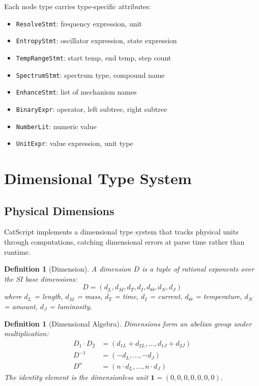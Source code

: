 \documentclass[twocolumn,10pt]{article}
\newtheorem{definition}[theorem]{Definition}
\begin{document}
Each node type carries type-specific attributes:
\begin{itemize}
    \item \texttt{ResolveStmt}: frequency expression, unit
    \item \texttt{EntropyStmt}: oscillator expression, state expression
    \item \texttt{TempRangeStmt}: start temp, end temp, step count
    \item \texttt{SpectrumStmt}: spectrum type, compound name
    \item \texttt{EnhanceStmt}: list of mechanism names
    \item \texttt{BinaryExpr}: operator, left subtree, right subtree
    \item \texttt{NumberLit}: numeric value
    \item \texttt{UnitExpr}: value expression, unit type
\end{itemize}

\section{Dimensional Type System}
\label{sec:types}

\subsection{Physical Dimensions}

CatScript implements a dimensional type system \cite{pierce2002types} that tracks physical units through computations, catching dimensional errors at parse time rather than runtime.

\begin{definition}[Dimension]
A dimension $D$ is a tuple of rational exponents over the SI base dimensions:
\begin{equation}
    D = (d_L, d_M, d_T, d_I, d_\Theta, d_N, d_J)
\end{equation}
where $d_L$ = length, $d_M$ = mass, $d_T$ = time, $d_I$ = current, $d_\Theta$ = temperature, $d_N$ = amount, $d_J$ = luminosity.
\end{definition}

\begin{definition}[Dimensional Algebra]
Dimensions form an abelian group under multiplication:
\begin{align}
    D_1 \cdot D_2 &= (d_{1L} + d_{2L}, \ldots, d_{1J} + d_{2J}) \\
    D^{-1} &= (-d_L, \ldots, -d_J) \\
    D^n &= (n \cdot d_L, \ldots, n \cdot d_J)
\end{align}
The identity element is the dimensionless unit $\mathbf{1} = (0,0,0,0,0,0,0)$.
\end{definition}
\end{document}
